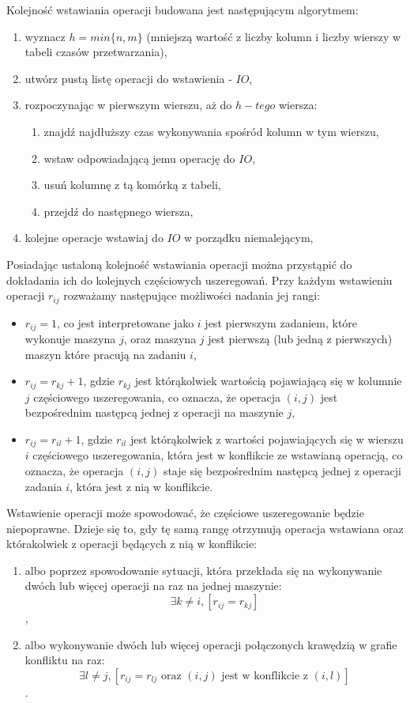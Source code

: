 \documentclass[brudnopis]{xmgr}
\begin{document}
Kolejność wstawiania operacji budowana jest następującym algorytmem:
\begin{enumerate}
    \item wyznacz $h = min\{n, m\}$ (mniejszą wartość z liczby kolumn i liczby wierszy w tabeli czasów przetwarzania),
    \item utwórz pustą listę operacji do wstawienia - $IO$,
    \item rozpoczynając w pierwszym wierszu, aż do $h-tego$ wiersza:
    \begin{enumerate}
        \item znajdź najdłuższy czas wykonywania spośród kolumn w tym wierszu,
        \item wstaw odpowiadającą jemu operację do $IO$,
        \item usuń kolumnę z tą komórką z tabeli,
        \item przejdź do następnego wiersza,
    \end{enumerate}
    \item kolejne operacje wstawiaj do $IO$ w porządku niemalejącym,
\end{enumerate}

Posiadając ustaloną kolejność wstawiania operacji można przystąpić do dokładania ich do kolejnych częściowych uszeregowań. Przy każdym wstawieniu operacji $r_{ij}$ rozważamy następujące możliwości nadania jej rangi:
\begin{itemize}
    \item $r_{ij} = 1$, co jest interpretowane jako $i$ jest pierwszym zadaniem, które wykonuje maszyna $j$, oraz maszyna $j$ jest pierwszą (lub jedną z pierwszych) maszyn które pracują na zadaniu $i$,
    \item $r_{ij} = r_{kj} + 1$, gdzie $r_{kj}$ jest którąkolwiek wartością pojawiającą się w kolumnie $j$ częściowego uszeregowania, co oznacza, że operacja $(i,j)$ jest bezpośrednim następcą jednej z operacji na maszynie $j$,
    \item $r_{ij} = r_{il} + 1$, gdzie $r_{il}$ jest którąkolwiek z wartości pojawiających się w wierszu $i$ częściowego uszeregowania, która jest w konflikcie ze wstawianą operacją, co oznacza, że operacja $(i,j)$ staje się bezpośrednim następcą jednej z operacji zadania $i$, która jest z nią w konflikcie.
\end{itemize}

Wstawienie operacji może spowodować, że częściowe uszeregowanie będzie niepoprawne. Dzieje się to, gdy tę samą rangę otrzymują operacja wstawiana oraz którakolwiek z operacji będących z nią w konflikcie:
\begin{enumerate}
    \item albo poprzez spowodowanie sytuacji, która przekłada się na wykonywanie dwóch lub więcej operacji na raz na jednej maszynie:
    $$\exists k \neq i, [r_{ij}=r_{kj}]$$,
    \item albo wykonywanie dwóch lub więcej operacji połączonych krawędzią w grafie konfliktu na raz:
    $$\exists l \neq j, [r_{ij}=r_{lj} \textrm{ oraz } (i,j) \textrm{ jest w konflikcie z } (i,l)]$$.
\end{enumerate}
 
\end{document}
